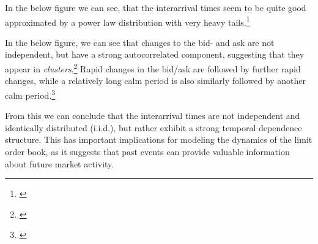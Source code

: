 \documentclass[12pt,a4paper]{cau_thesis}
\begin{document}
In the below figure we can see, that the interarrival times seem to
be quite good approximated by a power law distribution with very
heavy tails.\footnote{\cite[See ][, p.48]{cartea2015algorithmic}}
\begin{figure}[htbp]
    \vspace*{0.5cm}
    \centering
    \label{fig:interarrival_times}
\end{figure}
In the below figure, we can see that changes to the bid- and ask are
not independent, but have a strong autocorrelated component,
suggesting that they appear in \emph{clusters}.\footnote{\cite[See
    ][, p.49]{cartea2015algorithmic}} Rapid changes in the bid/ask are
followed by further rapid changes, while a relatively long calm
period is also similarly followed by another calm
period.\footnote{\cite[See ][, p.49]{cartea2015algorithmic}}
\begin{figure}[htbp]
    \vspace*{0.5cm}
    \centering
    \label{fig:acf_interarrival_times}
\end{figure}
From this we can conclude that the interarrival times are not
independent and identically distributed (i.i.d.), but rather exhibit
a strong temporal dependence structure. This has important
implications for modeling the dynamics of the limit order book, as it
suggests that past events can provide valuable information about
future market activity.
\end{document}

